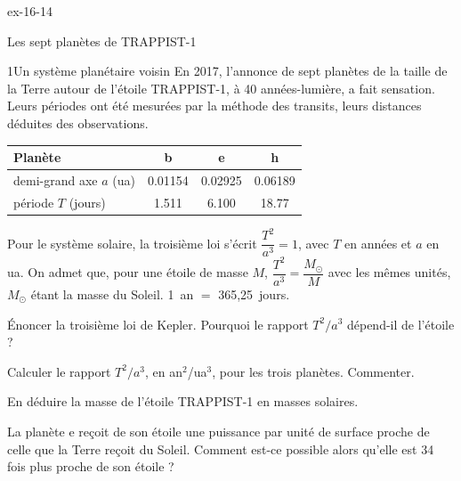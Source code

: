 \begin{blocLivre}{ex-16-14}
\begin{exercice}[3]{Les sept planètes de TRAPPIST-1}
\begin{docu}{1}{Un système planétaire voisin}
En 2017, l'annonce de sept planètes de la taille de la Terre autour de l'étoile TRAPPIST-1, à 40 années-lumière, a fait
sensation. Leurs périodes ont été mesurées par la méthode des transits, leurs distances déduites des observations.
\par\smallskip
{\small\renewcommand{\arraystretch}{1.2}
\begin{tabular}{@{}lccc@{}}\toprule
Planète & b & e & h\\\midrule
demi-grand axe $a$ (ua) & \num{0.01154} & \num{0.02925} & \num{0.06189}\\
période $T$ (jours) & \num{1.511} & \num{6.100} & \num{18.77}\\\bottomrule
\end{tabular}}
\end{docu}
\begin{donnees}
Pour le système solaire, la troisième loi s'écrit $\dfrac{T^2}{a^3}=1$, avec $T$ en années et $a$ en ua. On admet que, pour une étoile
de masse $M$, $\dfrac{T^2}{a^3}=\dfrac{M_\odot}{M}$ avec les mêmes unités, $M_\odot$ étant la masse du Soleil. 1~an $=$ 365,25~jours.
\end{donnees}
\begin{questions}
\item Énoncer la troisième loi de Kepler. Pourquoi le rapport $T^2/a^3$ dépend-il de l'étoile ?
\item Calculer le rapport $T^2/a^3$, en an$^2$/ua$^3$, pour les trois planètes. Commenter.
\item \initiative En déduire la masse de l'étoile TRAPPIST-1 en masses solaires.
\item La planète e reçoit de son étoile une puissance par unité de surface proche de celle que la Terre reçoit du Soleil.
Comment est-ce possible alors qu'elle est 34 fois plus proche de son étoile ?
\end{questions}
\end{exercice}
\end{blocLivre}
